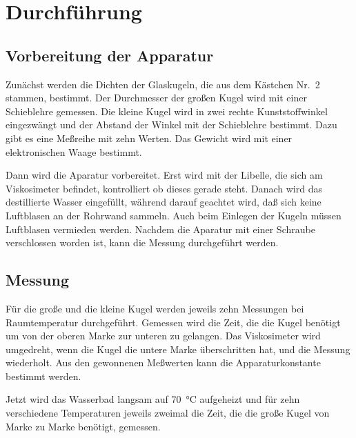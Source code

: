 
\section{Durchführung}

\subsection{Vorbereitung der Apparatur}

Zunächst werden die Dichten der Glaskugeln, die aus dem Kästchen Nr.~2
stammen, bestimmt. Der Durchmesser der großen Kugel wird mit einer
Schieblehre gemessen. Die kleine Kugel wird in zwei rechte
Kunststoffwinkel eingezwängt und der Abstand der Winkel mit der
Schieblehre bestimmt. Dazu gibt es eine Meßreihe mit zehn Werten. Das
Gewicht wird mit einer elektronischen Waage bestimmt.

Dann wird die Aparatur vorbereitet. Erst wird mit der Libelle, die sich
am Viskosimeter befindet, kontrolliert ob dieses gerade steht. Danach
wird das destillierte Wasser eingefüllt, während darauf geachtet wird,
daß sich keine Luftblasen an der Rohrwand sammeln. Auch beim Einlegen
der Kugeln müssen Luftblasen vermieden werden. Nachdem die Aparatur mit
einer Schraube verschlossen worden ist, kann die Messung durchgeführt
werden.

\subsection{Messung}

Für die große und die kleine Kugel werden jeweils zehn Messungen bei
Raumtemperatur durchgeführt. Gemessen wird die Zeit, die die Kugel
benötigt um von der oberen Marke zur unteren zu gelangen. Das
Viskosimeter wird umgedreht, wenn die Kugel die untere Marke
überschritten hat, und die Messung wiederholt. Aus den gewonnenen
Meßwerten kann die Apparaturkonstante bestimmt werden.

Jetzt wird das Wasserbad langsam auf \SI{70}{\degreeCelsius} aufgeheizt
und für zehn verschiedene Temperaturen jeweils zweimal die Zeit, die die
große Kugel von Marke zu Marke benötigt, gemessen.
